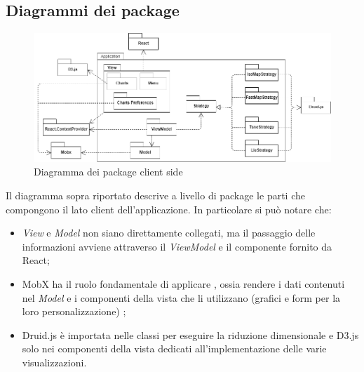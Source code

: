 \subsection{Diagrammi dei package}
\begin{figure}[hb]
\includegraphics[width=15.8cm]{Images/Allegato Tecnico-Package}
\centering
\caption{Diagramma dei package client side}
\end{figure}

Il diagramma sopra riportato descrive a livello di package le parti che compongono il lato client dell'applicazione. In particolare si può notare che:
\begin{itemize}
	\item \textit{View} e \textit{Model} non siano direttamente collegati, ma il passaggio delle informazioni avviene attraverso il \textit{ViewModel} e il componente  fornito da React;
	\item MobX ha il ruolo fondamentale di applicare , ossia rendere i dati contenuti nel \textit{Model}  e i componenti della vista che li utilizzano (grafici e form per la loro personalizzazione) ;
	\item Druid.js è importata nelle classi per eseguire la riduzione dimensionale e D3.js solo nei componenti della vista dedicati all'implementazione delle varie visualizzazioni.
\end{itemize}  %



